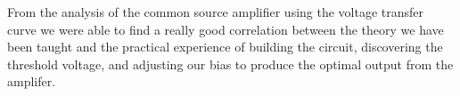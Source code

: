 From the analysis of the common source amplifier using the voltage transfer curve we were able to find a really good correlation between the theory we have been taught and the practical experience of building the circuit, discovering the threshold voltage, and adjusting our bias to produce the optimal output from the amplifer.
